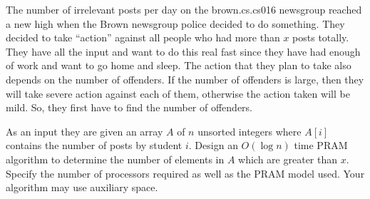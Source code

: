 The number of irrelevant posts per day on the brown.cs.cs016 newsgroup
reached a new high when the Brown newsgroup police decided to do
something. They decided to take ``action'' against all people who had
more than $x$ posts totally. They have all the input and want to do
this real fast since they have had enough of work and want to go home
and sleep. The action that they plan to take also depends on the
number of offenders. If the number of offenders is large, then they
will take severe action against each of them, otherwise the action
taken will be mild. So, they first have to find the number of
offenders.

As an input they are given an array $A$ of $n$ unsorted integers where
$A[i]$ contains the number of posts by student $i$. Design an $O(\log
n)$ time PRAM algorithm to determine the number of elements in $A$
which are greater than $x$. Specify the number of processors required
as well as the PRAM model used.  Your algorithm may use auxiliary
space.
